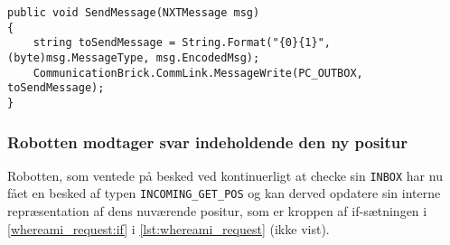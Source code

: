 \begin{lstlisting}[style=csharpsmall,label=lst:sendmessage,caption=SendMessage i NXTPostman]
public void SendMessage(NXTMessage msg)
{
    string toSendMessage = String.Format("{0}{1}", (byte)msg.MessageType, msg.EncodedMsg);
    CommunicationBrick.CommLink.MessageWrite(PC_OUTBOX, toSendMessage);
}
\end{lstlisting}

\subsubsection{Robotten modtager svar indeholdende den ny positur}
Robotten, som ventede på besked ved kontinuerligt at checke sin \lstinline[style=c]!INBOX! har nu fået en besked af typen \lstinline[style=c]!INCOMING_GET_POS! og kan derved opdatere sin interne repræsentation af dens nuværende positur, som er kroppen af if-sætningen i \cref{whereami_request:if} i \cref{lst:whereami_request} (ikke vist).
